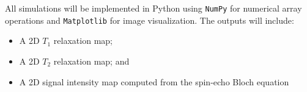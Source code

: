 \documentclass[10pt,a4paper,twoside]{article}
\begin{document}
All simulations will be implemented in Python using \texttt{NumPy} for numerical array operations and \texttt{Matplotlib} for image visualization. The outputs will include:
\begin{itemize}
    \item A 2D \(T_1\) relaxation map;
    \item A 2D \(T_2\) relaxation map; and
    \item A 2D signal intensity map computed from the spin-echo Bloch equation
\end{itemize}








\end{document}
